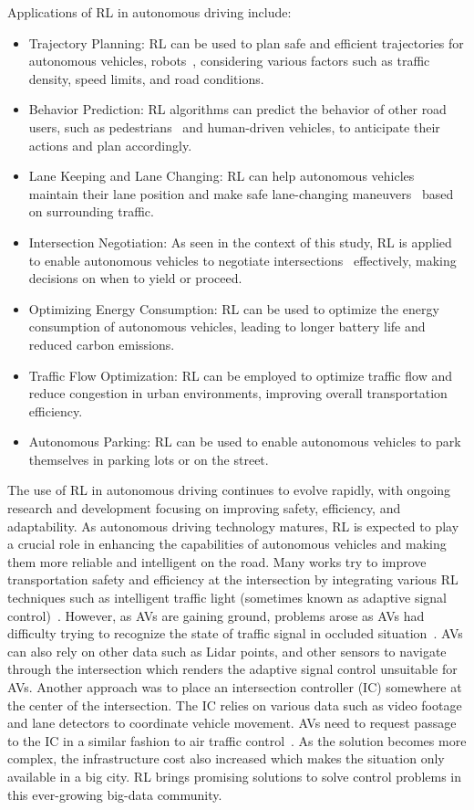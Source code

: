 Applications of RL in autonomous driving include:
\begin{itemize}
    \item Trajectory Planning: RL can be used to plan safe and efficient trajectories for autonomous vehicles, robots~\cite{9940484, 10.3389/fnbot.2022.883562}, considering various factors such as traffic density, speed limits, and road conditions.
    \item Behavior Prediction: RL algorithms can predict the behavior of other road users, such as pedestrians~\cite{Fintz2022} and human-driven vehicles, to anticipate their actions and plan accordingly.
    \item Lane Keeping and Lane Changing: RL can help autonomous vehicles maintain their lane position and make safe lane-changing maneuvers~\cite{Zhou2022} based on surrounding traffic.
    \item Intersection Negotiation: As seen in the context of this study, RL is applied to enable autonomous vehicles to negotiate intersections~\cite{qian2017autonomous, peng2021learning, wu2020cooperative} effectively, making decisions on when to yield or proceed.
    \item Optimizing Energy Consumption: RL can be used to optimize the energy consumption of autonomous vehicles, leading to longer battery life and reduced carbon emissions.
    \item Traffic Flow Optimization: RL can be employed to optimize traffic flow and reduce congestion in urban environments, improving overall transportation efficiency.
    \item Autonomous Parking: RL can be used to enable autonomous vehicles to park themselves in parking lots or on the street.
\end{itemize}
The use of RL in autonomous driving continues to evolve rapidly, with ongoing research and development focusing on improving safety, efficiency, and adaptability.
As autonomous driving technology matures, RL is expected to play a crucial role in enhancing the capabilities of autonomous vehicles and making them more reliable and intelligent on the road.
Many works try to improve transportation safety and
efficiency at the intersection by integrating various RL
techniques such as intelligent traffic light (sometimes known
as adaptive signal control)~\cite{yang2022inductive, wang2021adaptive, essa2020selflearning}.
However, as AVs are gaining ground, problems
arose as AVs had difficulty trying to recognize the state of
traffic signal in occluded situation~\cite{Isele2017}.
AVs can also rely on
other data such as Lidar points, and other sensors to navigate
through the intersection which renders the adaptive signal
control unsuitable for AVs.
Another approach was to place an
intersection controller (IC) somewhere at the center of the
intersection.
The IC relies on various data such as video
footage and lane detectors to coordinate vehicle movement.
AVs need to request passage to the IC in a similar fashion to
air traffic control~\cite{li2021planning, gunarathna2022intelligent, qian2017autonomous, chen2019intersection}.
As the solution becomes more
complex, the infrastructure cost also increased which makes
the situation only available in a big city.
RL brings promising
solutions to solve control problems in this ever-growing big-data community.
